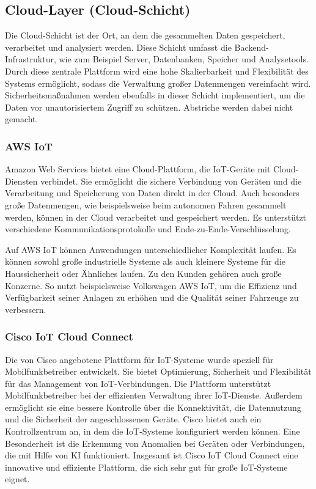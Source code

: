 \documentclass[12pt, a4paper]{article}
\begin{document}
\subsection{Cloud-Layer (Cloud-Schicht)}
\par Die Cloud-Schicht ist der Ort, an dem die gesammelten Daten gespeichert, verarbeitet und analysiert werden. Diese Schicht umfasst die Backend-Infrastruktur, wie zum Beispiel Server, Datenbanken, Speicher und Analysetools. Durch diese zentrale Plattform wird eine hohe Skalierbarkeit und Flexibilität des Systems ermöglicht, sodass die Verwaltung großer Datenmengen vereinfacht wird. Sicherheitsmaßnahmen werden ebenfalls in dieser Schicht implementiert, um die Daten vor unautorisiertem Zugriff zu schützen. Abstriche werden dabei nicht gemacht.
\subsubsection{AWS IoT}
\par Amazon Web Services bietet eine Cloud-Plattform, die IoT-Geräte mit Cloud-Diensten verbindet. Sie ermöglicht die sichere Verbindung von Geräten und die Verarbeitung und Speicherung von Daten direkt in der Cloud. Auch besonders große Datenmengen, wie beispielsweise beim autonomen Fahren gesammelt werden, können in der Cloud verarbeitet und gespeichert werden. Es unterstützt verschiedene Kommunikationsprotokolle und Ende-zu-Ende-Verschlüsselung.
\par Auf AWS IoT können Anwendungen unterschiedlicher Komplexität laufen. Es können sowohl große industrielle Systeme als auch kleinere Systeme für die Haussicherheit oder Ähnliches laufen. Zu den Kunden gehören auch große Konzerne. So nutzt beispielsweise Volkswagen AWS IoT, um die Effizienz und Verfügbarkeit seiner Anlagen zu erhöhen und die Qualität seiner Fahrzeuge zu verbessern.
\subsubsection{Cisco IoT Cloud Connect}
\par Die von Cisco angebotene Plattform für IoT-Systeme wurde speziell für Mobilfunkbetreiber entwickelt. Sie bietet Optimierung, Sicherheit und Flexibilität für das Management von IoT-Verbindungen. Die Plattform unterstützt Mobilfunkbetreiber bei der effizienten Verwaltung ihrer IoT-Dienste. Außerdem ermöglicht sie eine bessere Kontrolle über die Konnektivität, die Datennutzung und die Sicherheit der angeschlossenen Geräte. Cisco bietet auch ein Kontrollzentrum an, in dem die IoT-Systeme konfiguriert werden können. Eine Besonderheit ist die Erkennung von Anomalien bei Geräten oder Verbindungen, die mit Hilfe von KI funktioniert. Insgesamt ist Cisco IoT Cloud Connect eine innovative und effiziente Plattform, die sich sehr gut für große IoT-Systeme eignet.
\end{document}
